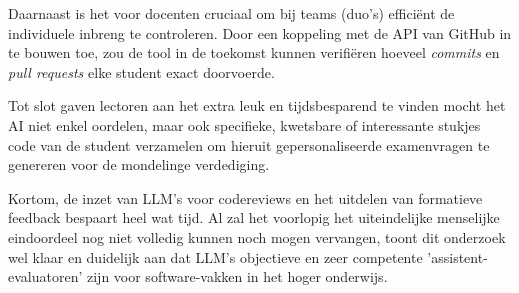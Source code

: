 \vspace{1em}

Daarnaast is het voor docenten cruciaal om bij teams (duo's) efficiënt de individuele inbreng te controleren. Door een koppeling met de API van GitHub in te bouwen toe, zou de tool in de toekomst kunnen verifiëren hoeveel \textit{commits} en \textit{pull requests} elke student exact doorvoerde.

\vspace{1em}

Tot slot gaven lectoren aan het extra leuk en tijdsbesparend te vinden mocht het AI niet enkel oordelen, maar ook specifieke, kwetsbare of interessante stukjes code van de student verzamelen om hieruit gepersonaliseerde examenvragen te genereren voor de mondelinge verdediging.

\vspace{1em}

Kortom, de inzet van LLM's voor codereviews en het uitdelen van formatieve feedback bespaart heel wat tijd. Al zal het voorlopig het uiteindelijke menselijke eindoordeel nog niet volledig kunnen noch mogen vervangen, toont dit onderzoek wel klaar en duidelijk aan dat LLM's objectieve en zeer competente 'assistent-evaluatoren' zijn voor software-vakken in het hoger onderwijs.

